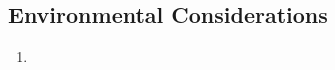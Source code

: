 \documentclass[10pt,letterpaper]{article}
\begin{document}
\subsection{Environmental Considerations}
\begin{enumerate}[{C.EN}.1:]
    \item 
\end{enumerate}

\clearpage
{}



\end{document}
